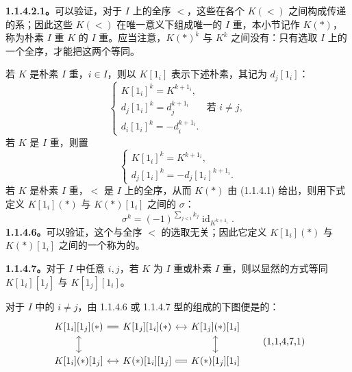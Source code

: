 \textbf{1.1.4.2.1。}可以验证，对于 $I$ 上的全序 $<$，这些在各个 $K(<)$ 之间构成传递的系；因此这些 $K(<)$ 在唯一意义下组成唯一的 $I$ 重，本小节记作 $K(*)$，称为朴素 $I$ 重 $K$ 的 $I$ 重。应当注意，$K(*)^k$ 与 $K^k$ 之间没有：只有选取 $I$ 上的一个全序，才能把这两个等同。

若 $K$ 是朴素 $I$ 重，$i\in I$，则以 $K[1_i]$ 表示下述朴素，其记为 $d_j[1_i]$：
\[
\begin{cases}
K[1_i]^k=K^{k+1_i},\\
d_j[1_i]^k=d_j^{k+1_i}&\text{若 }i\ne j,\\
d_i[1_i]^k=-d_i^{k+1_i}.
\end{cases}\tag{1.1.4.3}
\]
若 $K$ 是 $I$ 重，则置
\[
\begin{cases}
K[1_i]^k=K^{k+1_i},\\
d_j[1_i]^k=-d_j[1_i]^{k+1_i}.
\end{cases}\tag{1.1.4.4}
\]
若 $K$ 是朴素 $I$ 重，$<$ 是 $I$ 上的全序，从而 $K(*)$ 由 (1.1.4.1) 给出，则用下式定义 $K[1_i](*)$ 与 $K(*)[1_i]$ 之间的 $\sigma$：
\[
\sigma^k=(-1)^{\sum_{j<i}k_j}\operatorname{id}_{K^{k+1_i}}.\tag{1.1.4.5}
\]
\textbf{1.1.4.6。}可以验证，这个与全序 $<$ 的选取无关；因此它定义 $K[1_i](*)$ 与 $K(*)[1_i]$ 之间的一个称为的。

\textbf{1.1.4.7。}对于 $I$ 中任意 $i,j$，若 $K$ 为 $I$ 重或朴素 $I$ 重，则以显然的方式等同 $K[1_i][1_j]$ 与 $K[1_j][1_i]$。

对于 $I$ 中的 $i\ne j$，由 1.1.4.6 或 1.1.4.7 型的组成的下图便是的：
\[
\begin{tikzcd}[column sep=small]
K[1_i][1_j](*) \arrow[r,equal]\arrow[d,leftrightarrow]&K[1_j][1_i](*)\arrow[r,leftrightarrow]&K[1_j](*)[1_i]\arrow[d,leftrightarrow]\\
K[1_i](*)[1_j]\arrow[r,leftrightarrow]&K(*)[1_i][1_j]\arrow[r,equal]&K(*)[1_j][1_i]
\end{tikzcd}\tag{1,1,4,7,1}
\]

